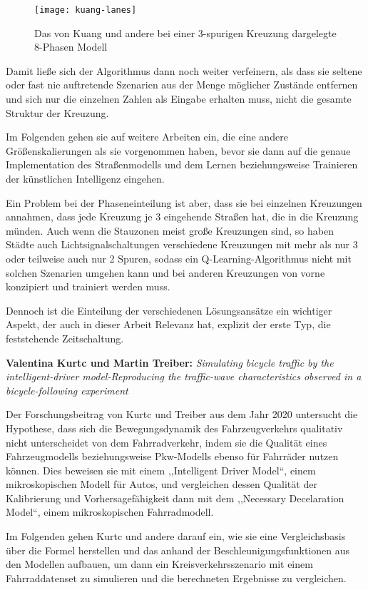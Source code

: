 \begin{figure}[h]
    \centering
    \texttt{[image: kuang-lanes]}~\caption{Das von Kuang und andere bei einer 3-spurigen Kreuzung dargelegte 8-Phasen Modell~\cite{Zheng2019}}
    \label{fig:kuang-lanes}
\end{figure}

Damit ließe sich der Algorithmus dann noch weiter verfeinern, als dass sie seltene oder fast nie auftretende Szenarien aus der Menge möglicher Zustände entfernen und sich nur die einzelnen Zahlen als Eingabe erhalten muss, nicht die gesamte Struktur der Kreuzung.

Im Folgenden gehen sie auf weitere Arbeiten ein, die eine andere Größenskalierungen als sie vorgenommen haben, bevor sie dann auf die genaue Implementation des Straßenmodells und dem Lernen beziehungsweise Trainieren der künstlichen Intelligenz eingehen.

Ein Problem bei der Phaseneinteilung ist aber, dass sie bei einzelnen Kreuzungen annahmen, dass jede Kreuzung je 3 eingehende Straßen hat, die in die Kreuzung münden.
Auch wenn die Stauzonen meist große Kreuzungen sind, so haben Städte auch Lichtsignalschaltungen verschiedene Kreuzungen mit mehr als nur 3 oder teilweise auch nur 2 Spuren, sodass ein Q-Learning-Algorithmus nicht mit solchen Szenarien umgehen kann und bei anderen Kreuzungen von vorne konzipiert und trainiert werden muss.

Dennoch ist die Einteilung der verschiedenen Lösungsansätze ein wichtiger Aspekt, der auch in dieser Arbeit Relevanz hat, explizit der erste Typ, die feststehende Zeitschaltung.


\textbf{Valentina Kurtc und Martin Treiber:}
\textit{Simulating bicycle traffic by the intelligent-driver model-Reproducing the traffic-wave characteristics observed in a bicycle-following experiment}

Der Forschungsbeitrag von Kurtc und Treiber aus dem Jahr 2020 untersucht die Hypothese, dass sich die Bewegungsdynamik des Fahrzeugverkehrs qualitativ nicht unterscheidet von dem Fahrradverkehr, indem sie die Qualität eines Fahrzeugmodells beziehungsweise Pkw-Modells ebenso für Fahrräder nutzen können.
Dies beweisen sie mit einem ,,Intelligent Driver Model``\cite{Kurtc2020}, einem mikroskopischen Modell für Autos, und vergleichen dessen Qualität der Kalibrierung und Vorhersagefähigkeit dann mit dem ,,Necessary Decelaration Model``\cite{Kurtc2020}, einem mikroskopischen Fahrradmodell.

Im Folgenden gehen Kurtc und andere darauf ein, wie sie eine Vergleichsbasis über die Formel herstellen und das anhand der Beschleunigungsfunktionen aus den Modellen aufbauen, um dann ein Kreisverkehrsszenario mit einem Fahrraddatenset zu simulieren und die berechneten Ergebnisse zu vergleichen.


